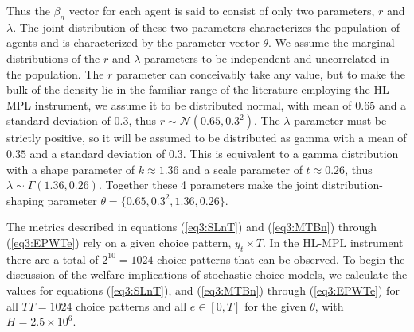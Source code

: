 \documentclass[../main.tex]{subfiles}
\begin{document}
\noindent Thus the $\beta_n$ vector for each agent is said to consist of only two parameters, $r$ and $\lambda$.
The joint distribution of these two parameters characterizes the population of agents and is characterized by the parameter vector $\theta$.
We assume the marginal distributions of the $r$ and $\lambda$ parameters to be independent and uncorrelated in the population.{\footnotemark}
The $r$ parameter can conceivably take any value, but to make the bulk of the density lie in the familiar range of the literature employing the HL-MPL instrument, we assume it to be distributed normal, with mean of $0.65$ and a standard deviation of $0.3$, thus $r \sim \mathcal{N}(0.65 , 0.3^2 )$.
The $\lambda$ parameter must be strictly positive, so it will be assumed to be distributed as gamma with a mean of $0.35$ and a standard deviation of $0.3$.
This is equivalent to a gamma distribution with a shape parameter of $k \approx 1.36$ and a scale parameter of $t\approx0.26$, thus $\lambda \sim \Gamma(1.36 , 0.26)$.
Together these 4 parameters make the joint distribution-shaping parameter $\theta=\{0.65 ,0.3^2, 1.36 , 0.26\}$.

The metrics described in equations (\ref{eq3:SLnT}) and (\ref{eq3:MTBn}) through (\ref{eq3:EPWTe}) rely on a given choice pattern, $y_t \times T$.
In the HL-MPL instrument there are a total of $2^{10}=1024$ choice patterns that can be observed.
To begin the discussion of the welfare implications of stochastic choice models, we calculate the values for equations (\ref{eq3:SLnT}), and (\ref{eq3:MTBn}) through (\ref{eq3:EPWTe}) for all $\mathit{TT} =1024$ choice patterns and all $e \in[0,T]$ for the given $\theta$, with $H=2.5 \times 10^6$.{\footnotemark} 

\addtocounter{footnote}{-3}
\end{document}
